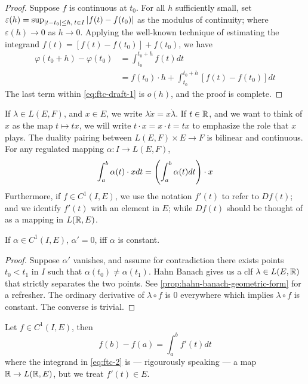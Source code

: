 \documentclass[../main-manifolds.tex]{subfiles}
\begin{document}
\begin{proof}
    Suppose $f$ is continuous at $t_0$. For all $h$ sufficiently small, set $\varepsilon(h) = \sup_{{\abs{t-t_0}\leq h, \: t\in I}}\abs{f(t) - f(t_0)}$ as the modulus of continuity; where $\varepsilon(h)\to 0$ as $h\to 0$. Applying the well-known technique of estimating the integrand $f(t) = [f(t) - f(t_0)] + f(t_0)$, we have
    \begin{align}
        \varphi(t_0 + h) - \varphi(t_0) &= \int_{t_0}^{t_0 + h}f(t) dt\nonumber\\
        &= f(t_0)\cdot h + \int_{t_0}^{t_0 + h}[f(t) - f(t_0)]dt\label{eq:ftc-draft-1}
    \end{align}
    The last term within \cref{eq:ftc-draft-1} is $o(h)$, and the proof is complete.
\end{proof}
If $\lambda\in L(E,F)$, and $x\in E$, we write $\lambda \dot x = x\dot \lambda$. If $t\in \mathbb{R}$, and we want to think of $x$ as the map $t\mapsto tx$, we will write $t\cdot x = x\cdot t = tx$ to emphasize the role that $x$ plays. The duality pairing between $L(E,F)\times E\to F$ is bilinear and continuous. For any regulated mapping $\alpha: I\to L(E,F)$, 
\begin{equation}\label{eq:regulated-mapping-application}
    \int_a^b \alpha(t)\cdot x dt = \qty(\int_a^b \alpha(t) dt)\cdot x
\end{equation}
Furthermore, if $f\in C^1(I, E)$, we use the notation $f'(t)$ to refer to $Df(t)$; and we identify $f'(t)$ with an element in $E$; while $Df(t)$ should be thought of as a mapping in $L(\mathbb{R},E)$.
%
\begin{lemma}\label{lem:vanishing-derivative-implies-constant}
    If $\alpha\in C^1(I,E)$, $\alpha'=0$, iff $\alpha$ is constant.
\end{lemma}
\begin{proof}
    Suppose $\alpha'$ vanishes, and assume for contradiction there exists points $t_0< t_1$ in $I$ such that $\alpha(t_0)\neq \alpha(t_1)$. Hahn Banach gives us a clf $\lambda\in L(E,\mathbb{R})$ that strictly separates the two points. See \cref{prop:hahn-banach-geometric-form} for a refresher. The ordinary derivative of $\lambda\circ f$ is $0$ everywhere which implies $\lambda\circ f$ is constant. The converse is trivial.
\end{proof}
\begin{lemma}[FTC 2]\label{lem:ftc-2}
    Let $f\in C^1(I, E)$, then
    \begin{equation}\label{eq:ftc-2}
        f(b) - f(a) = \int_a^b f'(t)dt    
    \end{equation}
    where the integrand in \cref{eq:ftc-2} is --- rigourously speaking --- a map  $\mathbb{R}\to L(\mathbb{R},E)$, but we treat $f'(t)\in E$.
\end{lemma}
\end{document}
